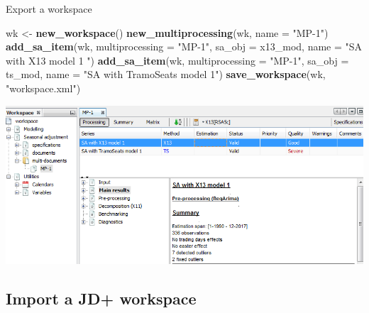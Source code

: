 \documentclass[10pt,xcolor=table,color={dvipsnames,usenames},ignorenonframetext,usepdftitle=false,french]{beamer}
\newenvironment{Shaded}{\begin{snugshade}}{\end{snugshade}}
\newcommand{\DataTypeTok}[1]{\textcolor[rgb]{0.13,0.29,0.53}{#1}}
\newcommand{\KeywordTok}[1]{\textcolor[rgb]{0.13,0.29,0.53}{\textbf{#1}}}
\newcommand{\NormalTok}[1]{#1}
\newcommand{\StringTok}[1]{\textcolor[rgb]{0.31,0.60,0.02}{#1}}
\begin{document}
\begin{frame}[fragile]{Export a workspace}
\protect\hypertarget{export-a-workspace}{}

\footnotesize

\begin{Shaded}
\begin{Highlighting}[]
\NormalTok{wk <-}\StringTok{ }\KeywordTok{new_workspace}\NormalTok{()}
\KeywordTok{new_multiprocessing}\NormalTok{(wk, }\DataTypeTok{name =} \StringTok{"MP-1"}\NormalTok{)}
\KeywordTok{add_sa_item}\NormalTok{(wk, }\DataTypeTok{multiprocessing =} \StringTok{"MP-1"}\NormalTok{,}
            \DataTypeTok{sa_obj =}\NormalTok{ x13_mod, }\DataTypeTok{name =}  \StringTok{"SA with X13 model 1 "}\NormalTok{)}
\KeywordTok{add_sa_item}\NormalTok{(wk, }\DataTypeTok{multiprocessing =}  \StringTok{"MP-1"}\NormalTok{,}
            \DataTypeTok{sa_obj =}\NormalTok{ ts_mod, }\DataTypeTok{name =} \StringTok{"SA with TramoSeats model 1"}\NormalTok{)}
\KeywordTok{save_workspace}\NormalTok{(wk, }\StringTok{"workspace.xml"}\NormalTok{)}
\end{Highlighting}
\end{Shaded}

\includegraphics{img/workspace.png}

\end{frame}

\hypertarget{import-a-jd-workspace}{%
\subsection{Import a JD+ workspace}\label{import-a-jd-workspace}}
\end{document}
